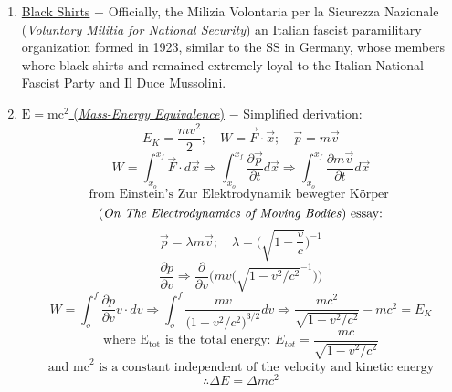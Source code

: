 \documentclass[12pt]{article}
\begin{document}
\begin{flushleft}
\begin{enumerate}
\item \underline{Black Shirts} $-$ Officially, the Milizia Volontaria per la Sicurezza Nazionale (\emph{Voluntary Militia for National Security}) an Italian fascist paramilitary organization formed in 1923, similar to the SS in Germany, whose members whore black shirts and remained extremely loyal to the Italian National Fascist Party and Il Duce Mussolini. 

\item \underline{$\text{E}=\text{mc}^\text{2}$ (\emph{Mass-Energy Equivalence})} $-$ Simplified derivation:
$$E_K = \frac{mv^2}{2}; \quad W=\vec{F}\cdot \vec{x}; \quad \vec{p} = m\vec{v} $$ 
$$ W = \int_{x_o}^{x_f}\vec{F}\cdot d\vec{x} \Rightarrow \int_{x_o}^{x_f}\frac{\partial\vec{p}}{\partial t} d\vec{x} \Rightarrow \int_{x_o}^{x_f}\frac{\partial m\vec{v}}{\partial t} d\vec{x} $$ 
$$ \text{from Einstein's Zur Elektrodynamik bewegter K\"orper }$$
$$\text{(\emph{On The Electrodynamics of Moving Bodies}) essay:}$$
$$\vec{p} = \lambda m\vec{v}; \quad \lambda = \biggl(\sqrt{1-\frac{v}{c}}\biggr)^{-1} $$
$$ \frac{\partial p}{\partial v} \Rightarrow \frac{\partial}{\partial v}\biggl(mv\biggl(\sqrt{1-v^2/c^2}^{-1}\biggr)\biggr) $$
$$ W = \int_o^f\frac{\partial p}{\partial v} v\cdot dv \Rightarrow \int_o^f\frac{mv}{\biggl(1-v^2/c^2\biggr)^{3/2}} dv \Rightarrow \frac{mc^2}{\sqrt{1-v^2/c^2}}-mc^2 = E_K $$
$$ \text{where $\text{E}_\text{tot}$ is the total energy: } E_{tot} = \frac{mc}{\sqrt{1-v^2/c^2}} $$
$$ \text{and mc}^\text{2} \text{ is a constant independent of the velocity and kinetic energy} $$ 
$$ \therefore \Delta E = \Delta mc^2 $$

\end{enumerate}
\end{flushleft}
\end{document}
